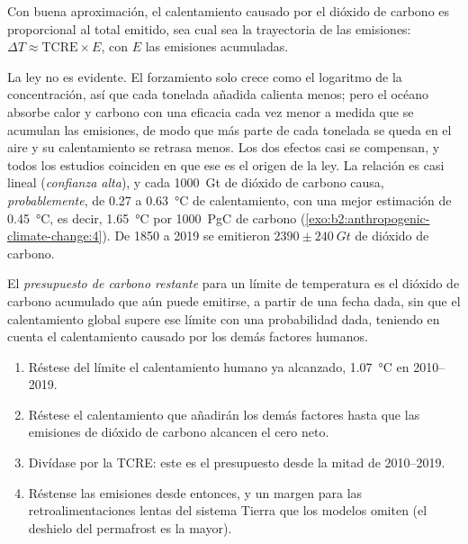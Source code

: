 \begin{proposition}\label{prop:b2:anthropogenic-climate-change:tcre}
Con buena aproximación, el calentamiento causado por el dióxido de carbono es proporcional al total emitido,
sea cual sea la trayectoria de las emisiones: $\Delta T \approx \text{TCRE} \times E$, con $E$ las emisiones
acumuladas.
\end{proposition}
\admitted

La ley no es evidente. El forzamiento solo crece como el logaritmo de la concentración, así que cada
tonelada añadida calienta menos; pero el océano absorbe calor y carbono con una eficacia cada vez menor a medida que
se acumulan las emisiones, de modo que más parte de cada tonelada se queda en el aire y su calentamiento se retrasa menos. Los
dos efectos casi se compensan, y todos los estudios coinciden en que ese es el origen de la ley. La relación es
casi lineal (\emph{confianza alta}), y cada \qty{1000}{Gt} de dióxido de carbono causa, \emph{probablemente},
de 0.27 a \qty{0.63}{\celsius} de calentamiento, con una mejor estimación de \qty{0.45}{\celsius}, es decir, \qty{1.65}{\celsius}
por \qty{1000}{PgC} de carbono (\cref{exo:b2:anthropogenic-climate-change:4}). De 1850 a 2019 se emitieron
$\num{2390} \pm \qty{240}{Gt}$ de dióxido de carbono.

\begin{definition}\label{def:b2:anthropogenic-climate-change:budget}
El \emph{presupuesto de carbono restante} para un límite de temperatura es el
dióxido de carbono acumulado que aún puede emitirse, a partir de una fecha dada, sin que el calentamiento global supere
ese límite con una probabilidad dada, teniendo en cuenta el calentamiento causado por los demás factores
humanos.
\end{definition}

\begin{method}\label{met:b2:anthropogenic-climate-change:budget}
\begin{enumerate}
  \item Réstese del límite el calentamiento humano ya alcanzado, \qty{1.07}{\celsius} en
        2010--2019.
  \item Réstese el calentamiento que añadirán los demás factores hasta que las emisiones de dióxido de carbono
        alcancen el cero neto.
  \item Divídase por la TCRE: este es el presupuesto desde la mitad de 2010--2019.
  \item Réstense las emisiones desde entonces, y un margen para las retroalimentaciones lentas del sistema Tierra que
        los modelos omiten (el deshielo del permafrost es la mayor).
\end{enumerate}
\end{method}

